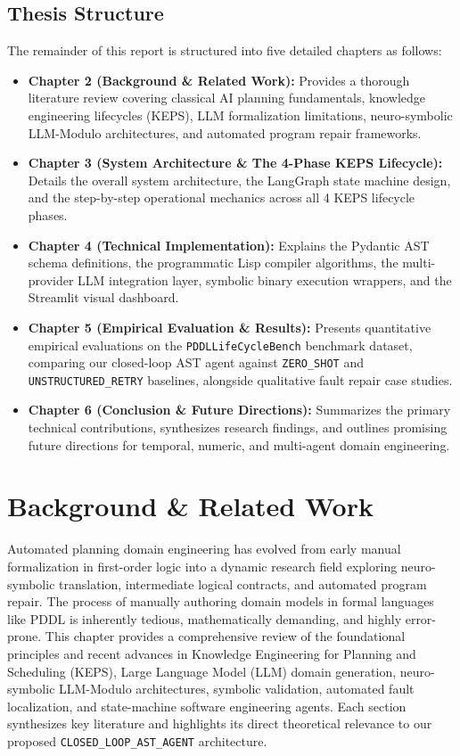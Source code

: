 \documentclass[11pt,a4paper]{report}
\begin{document}
\section{Thesis Structure}
The remainder of this report is structured into five detailed chapters as follows:
\begin{itemize}
    \item \textbf{Chapter 2 (Background \& Related Work):} Provides a thorough literature review covering classical AI planning fundamentals, knowledge engineering lifecycles (KEPS), LLM formalization limitations, neuro-symbolic LLM-Modulo architectures, and automated program repair frameworks.
    \item \textbf{Chapter 3 (System Architecture \& The 4-Phase KEPS Lifecycle):} Details the overall system architecture, the LangGraph state machine design, and the step-by-step operational mechanics across all 4 KEPS lifecycle phases.
    \item \textbf{Chapter 4 (Technical Implementation):} Explains the Pydantic AST schema definitions, the programmatic Lisp compiler algorithms, the multi-provider LLM integration layer, symbolic binary execution wrappers, and the Streamlit visual dashboard.
    \item \textbf{Chapter 5 (Empirical Evaluation \& Results):} Presents quantitative empirical evaluations on the \texttt{PDDLLifeCycleBench} benchmark dataset, comparing our closed-loop AST agent against \texttt{ZERO\_SHOT} and \texttt{UNSTRUCTURED\_RETRY} baselines, alongside qualitative fault repair case studies.
    \item \textbf{Chapter 6 (Conclusion \& Future Directions):} Summarizes the primary technical contributions, synthesizes research findings, and outlines promising future directions for temporal, numeric, and multi-agent domain engineering.
\end{itemize}


\chapter{Background \& Related Work}

Automated planning domain engineering has evolved from early manual formalization in first-order logic into a dynamic research field exploring neuro-symbolic translation, intermediate logical contracts, and automated program repair. The process of manually authoring domain models in formal languages like PDDL is inherently tedious, mathematically demanding, and highly error-prone. This chapter provides a comprehensive review of the foundational principles and recent advances in Knowledge Engineering for Planning and Scheduling (KEPS), Large Language Model (LLM) domain generation, neuro-symbolic LLM-Modulo architectures, symbolic validation, automated fault localization, and state-machine software engineering agents. Each section synthesizes key literature and highlights its direct theoretical relevance to our proposed \texttt{CLOSED\_LOOP\_AST\_AGENT} architecture.
\end{document}

